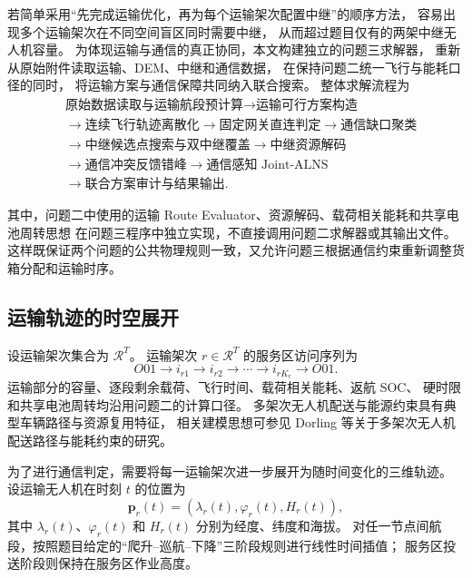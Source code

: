 若简单采用“先完成运输优化，再为每个运输架次配置中继”的顺序方法，
容易出现多个运输架次在不同空间盲区同时需要中继，
从而超过题目仅有的两架中继无人机容量。
为体现运输与通信的真正协同，本文构建独立的问题三求解器，
重新从原始附件读取运输、DEM、中继和通信数据，
在保持问题二统一飞行与能耗口径的同时，
将运输方案与通信保障共同纳入联合搜索。
整体求解流程为
\[
\boxed{
\begin{aligned}
&\text{原始数据读取与运输航段预计算}
\rightarrow \text{运输可行方案构造} \\
&\rightarrow \text{连续飞行轨迹离散化}
\rightarrow \text{固定网关直连判定}
\rightarrow \text{通信缺口聚类} \\
&\rightarrow \text{中继候选点搜索与双中继覆盖}
\rightarrow \text{中继资源解码} \\
&\rightarrow \text{通信冲突反馈错峰}
\rightarrow \text{通信感知 Joint-ALNS} \\
&\rightarrow \text{联合方案审计与结果输出}.
\end{aligned}}
\]

其中，问题二中使用的运输 Route Evaluator、资源解码、载荷相关能耗和共享电池周转思想
在问题三程序中独立实现，不直接调用问题二求解器或其输出文件。
这样既保证两个问题的公共物理规则一致，又允许问题三根据通信约束重新调整货箱分配和运输时序。

\subsection{运输轨迹的时空展开}

设运输架次集合为 $\mathcal{R}^{T}$。
运输架次 $r\in\mathcal{R}^{T}$ 的服务区访问序列为
\[
O01\rightarrow i_{r1}\rightarrow i_{r2}
\rightarrow\cdots\rightarrow i_{rK_r}\rightarrow O01.
\]
运输部分的容量、逐段剩余载荷、飞行时间、载荷相关能耗、返航 SOC、
硬时限和共享电池周转均沿用问题二的计算口径。
多架次无人机配送与能源约束具有典型车辆路径与资源复用特征，
相关建模思想可参见 Dorling 等关于多架次无人机配送路径与能耗约束的研究\cite{q3-dorling2017}。

为了进行通信判定，需要将每一运输架次进一步展开为随时间变化的三维轨迹。
设运输无人机在时刻 $t$ 的位置为
\begin{equation}
\mathbf{p}_r(t)
=\left(\lambda_r(t),\varphi_r(t),H_r(t)\right),
\label{eq:q3-trajectory}
\end{equation}
其中 $\lambda_r(t)$、$\varphi_r(t)$ 和 $H_r(t)$ 分别为经度、纬度和海拔。
对任一节点间航段，按照题目给定的“爬升--巡航--下降”三阶段规则进行线性时间插值；
服务区投送阶段则保持在服务区作业高度。

